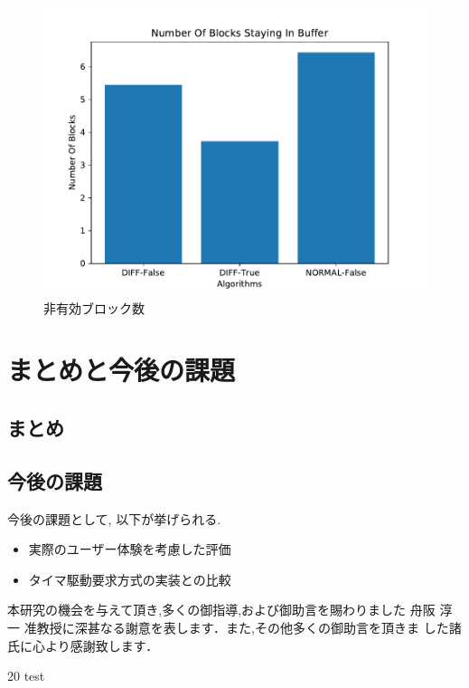 \documentclass[a4j,12pt]{gradthesis_utf8}
\begin{document}
\newpage

\begin{figure}[h]
	\begin{center}
		\includegraphics[width=15cm]{NumberOfBlocksStayingInBufferPubIBRC.pdf}
		\caption{非有効ブロック数}
		\label{nsbpub}
	\end{center}
\end{figure}
 
\chapter{まとめと今後の課題}\label{sec:sec7}
\section{まとめ}
\section{今後の課題}
\hspace*{0.5em}今後の課題として, 以下が挙げられる.
\begin{itemize}
    \item 実際のユーザー体験を考慮した評価
    \item タイマ駆動要求方式の実装との比較
\end{itemize}

\clearpage
%
\begin{acknowledgment}
 本研究の機会を与えて頂き,多くの御指導,および御助言を賜わりました
舟阪 淳一 准教授に深甚なる謝意を表します．また,その他多くの御助言を頂きま
した諸氏に心より感謝致します．
\end{acknowledgment}
\begin {thebibliography}{20} 
 test

\end {thebibliography}
\end{document}
